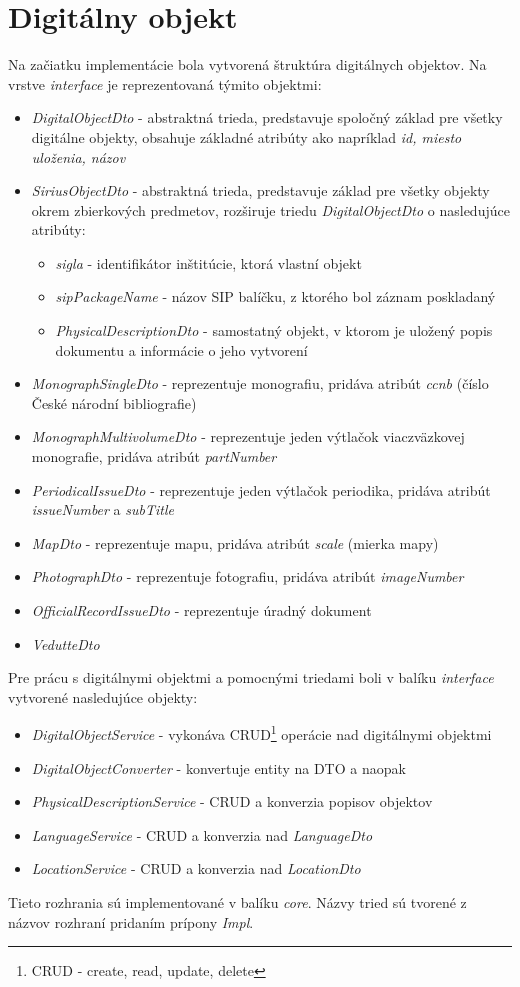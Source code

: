 \documentclass[
  print, %
  table,   %
  lof,     %
  nolot,     %
]{fithesis3}
\begin{document}
\section{Digitálny objekt}
Na začiatku implementácie bola vytvorená štruktúra digitálnych objektov. Na vrstve \textit{interface} je reprezentovaná týmito objektmi:
\begin{itemize}
	\item \textit{DigitalObjectDto} - abstraktná trieda, predstavuje spoločný základ pre všetky digitálne objekty, obsahuje základné atribúty ako napríklad \textit{id, miesto uloženia, názov}
	\item \textit{SiriusObjectDto} - abstraktná trieda, predstavuje základ pre všetky objekty okrem zbierkových predmetov, rozširuje triedu \textit{DigitalObjectDto} o nasledujúce atribúty:
	\begin{itemize}
		\item \textit{sigla} - identifikátor inštitúcie, ktorá vlastní objekt
		\item \textit{sipPackageName} - názov SIP balíčku, z ktorého bol záznam poskladaný
		\item \textit{PhysicalDescriptionDto} - samostatný objekt, v ktorom je uložený popis dokumentu a informácie o jeho vytvorení
	\end{itemize}
	\item \textit{MonographSingleDto} - reprezentuje monografiu, pridáva atribút \textit{ccnb} (číslo České národní bibliografie)
	\item \textit{MonographMultivolumeDto} - reprezentuje jeden výtlačok viaczväzkovej monografie, pridáva atribút \textit{partNumber}
	\item \textit{PeriodicalIssueDto} - reprezentuje jeden výtlačok periodika, pridáva atribút \textit{issueNumber} a \textit{subTitle}
	\item \textit{MapDto} - reprezentuje mapu, pridáva atribút \textit{scale} (mierka mapy)
	\item \textit{PhotographDto} - reprezentuje fotografiu, pridáva atribút \textit{imageNumber}
	\item \textit{OfficialRecordIssueDto} - reprezentuje úradný dokument
	\item \textit{VedutteDto}	
\end{itemize}
Pre prácu s digitálnymi objektmi a pomocnými triedami boli v balíku \textit{interface} vytvorené nasledujúce objekty:
\begin{itemize}
	\item \textit{DigitalObjectService} - vykonáva CRUD\footnote{CRUD - create, read, update, delete} operácie nad digitálnymi objektmi
	\item \textit{DigitalObjectConverter} - konvertuje entity na DTO a naopak
	\item \textit{PhysicalDescriptionService} - CRUD a konverzia popisov objektov
	\item \textit{LanguageService} - CRUD a konverzia nad \textit{LanguageDto}
	\item \textit{LocationService} - CRUD a konverzia nad \textit{LocationDto}
\end{itemize}
Tieto rozhrania sú implementované v balíku \textit{core}. Názvy tried sú tvorené z názvov rozhraní pridaním prípony \textit{Impl}.
\end{document}
